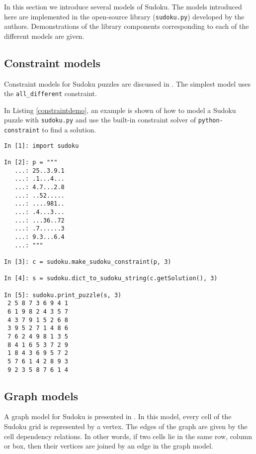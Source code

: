 In this section we introduce several models of Sudoku. The models introduced here are implemented in the open-source library (\texttt{sudoku.py}) developed by the authors. Demonstrations of the library components corresponding to each of the different models are given.

\begin{center}
 \librarytable
\end{center}

\subsection{Constraint models}
\label{sec:models:constraints}

Constraint models for Sudoku puzzles are discussed in \cite{simonissudoku}. The simplest model uses the \texttt{all\_different} constraint.

In Listing \ref{constraintdemo}, an example is shown of how to model a Sudoku puzzle with \texttt{sudoku.py} and use the built-in constraint solver of \texttt{python-constraint} to find a solution.

\begin{lstlisting}[caption=Solving a Sudoku via constraint model,label=constraintdemo]
In [1]: import sudoku

In [2]: p = """
   ...: 25..3.9.1
   ...: .1...4...
   ...: 4.7...2.8
   ...: ..52.....
   ...: ....981..
   ...: .4...3...
   ...: ...36..72
   ...: .7......3
   ...: 9.3...6.4
   ...: """

In [3]: c = sudoku.make_sudoku_constraint(p, 3)

In [4]: s = sudoku.dict_to_sudoku_string(c.getSolution(), 3)

In [5]: sudoku.print_puzzle(s, 3)
 2 5 8 7 3 6 9 4 1 
 6 1 9 8 2 4 3 5 7 
 4 3 7 9 1 5 2 6 8 
 3 9 5 2 7 1 4 8 6 
 7 6 2 4 9 8 1 3 5 
 8 4 1 6 5 3 7 2 9 
 1 8 4 3 6 9 5 7 2 
 5 7 6 1 4 2 8 9 3 
 9 2 3 5 8 7 6 1 4 

\end{lstlisting}

\subsection{Graph models}
\label{sec:models:graph}

A graph model for Sudoku is presented in \cite{gagovargaset}. In this model, every cell of the Sudoku grid is represented by a vertex. The edges of the graph are given by the cell dependency relations. In other words, if two cells lie in the same row, column or box, then their vertices are joined by an edge in the graph model.

